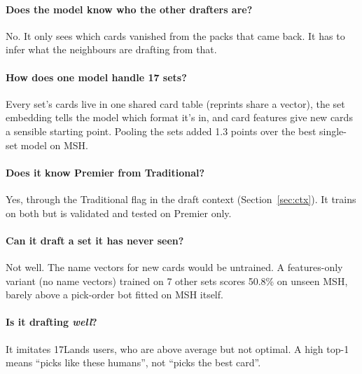 \documentclass[11pt,letterpaper]{article}
\begin{document}
\paragraph{Does the model know who the other drafters are?} No. It only sees which cards vanished from
the packs that came back. It has to infer what the neighbours are drafting from that.

\paragraph{How does one model handle 17 sets?} Every set's cards live in one shared card table (reprints
share a vector), the set embedding tells the model which format it's in, and card features give new cards
a sensible starting point. Pooling the sets added 1.3 points over the best single-set model on MSH.

\paragraph{Does it know Premier from Traditional?} Yes, through the Traditional flag in the draft
context (Section~\ref{sec:ctx}). It trains on both but is validated and tested on Premier only.

\paragraph{Can it draft a set it has never seen?} Not well. The name vectors for new cards would be
untrained. A features-only variant (no name vectors) trained on 7 other sets scores 50.8\% on unseen MSH,
barely above a pick-order bot fitted on MSH itself.

\paragraph{Is it drafting \emph{well}?} It imitates 17Lands users, who are above average but not
optimal. A high top-1 means ``picks like these humans'', not ``picks the best card''.
\end{document}
